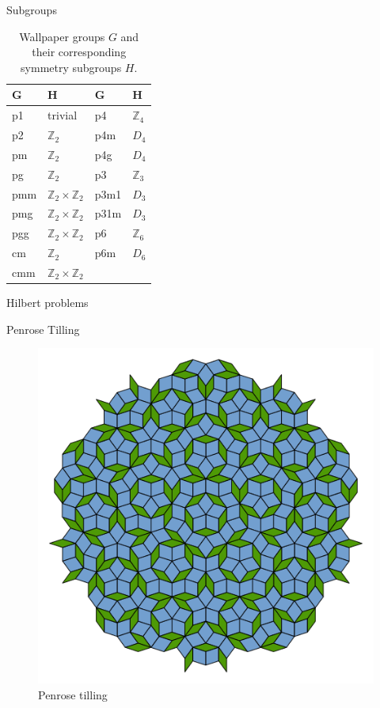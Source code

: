 \documentclass{beamer}
\begin{document}
\begin{frame}{Subgroups}
  \begin{table}
    \centering
    \begin{tabular}{@{} ll @{\qquad} ll @{}}
      \toprule
      \textbf{G} & \textbf{H} & \textbf{G} & \textbf{H} \\
      \midrule
      p1   & trivial                          & p4    & $\mathbb{Z}_4$              \\
      p2   & $\mathbb{Z}_2$                   & p4m   & $D_4$                       \\
      pm   & $\mathbb{Z}_2$                   & p4g   & $D_4$                       \\
      pg   & $\mathbb{Z}_2$                   & p3    & $\mathbb{Z}_3$              \\
      pmm  & $\mathbb{Z}_2\times\mathbb{Z}_2$ & p3m1  & $D_3$                       \\
      pmg  & $\mathbb{Z}_2\times\mathbb{Z}_2$ & p31m  & $D_3$                       \\
      pgg  & $\mathbb{Z}_2\times\mathbb{Z}_2$ & p6    & $\mathbb{Z}_6$              \\
      cm   & $\mathbb{Z}_2$                   & p6m   & $D_6$                       \\
      cmm  & $\mathbb{Z}_2\times\mathbb{Z}_2$ &       &                             \\
      \bottomrule
    \end{tabular}
    \caption{Wallpaper groups \(G\) and their corresponding symmetry subgroups \(H\).} \cite{sasse_2020}
  \end{table}
\end{frame}


\begin{frame}{Hilbert problems}
    
\end{frame}

\begin{frame}{Penrose Tilling}
    \begin{figure}
        \centering
        \includegraphics[width=0.5\linewidth]{images/Penrose_Tiling_(Rhombi).svg.png}
        \caption{Penrose tilling}
        \label{fig:penrose-rhombi}
    \end{figure}
\end{frame}
\end{document}
